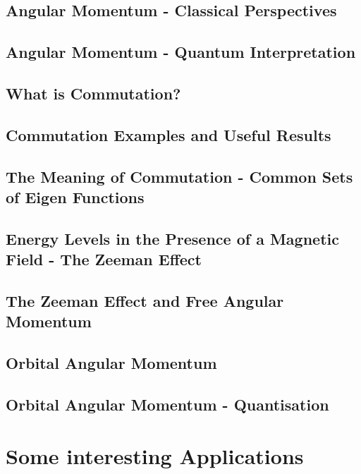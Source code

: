 \documentclass[colorlinks,11pt,a4paper,normalphoto,withhyper,ragged2e]{altareport}
\begin{document}
	\subsection{Angular Momentum - Classical Perspectives}
	
	
	\subsection{Angular Momentum - Quantum Interpretation}
	
	
	\subsection{What is Commutation?}
	
	
	\subsection{Commutation Examples and Useful Results}
	
	
	\subsection{The Meaning of Commutation - Common Sets of Eigen Functions}
	
	
	\subsection{Energy Levels in the Presence of a Magnetic Field - The Zeeman Effect}
	
	
	\subsection{The Zeeman Effect and Free Angular Momentum}
	
	
	\subsection{Orbital Angular Momentum}
	
	
	\subsection{Orbital Angular Momentum - Quantisation}
	
	
	\pagebreak
	

\section{Some interesting Applications}
	
\end{document}
